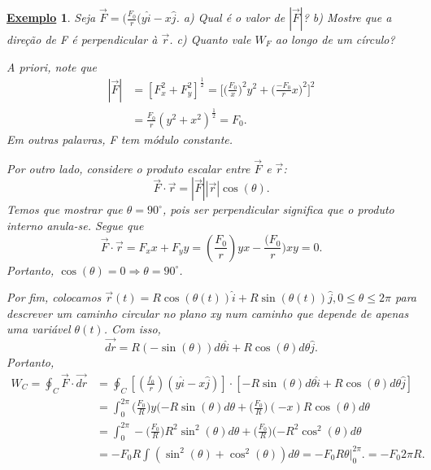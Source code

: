 \documentclass{article}
\newtheorem{example}{\underline{Exemplo}}
\begin{document}
   \begin{example}
      Seja \(\vec{F} = (\frac{F_{0}}{r}(y\hat{i}-x\hat{j}\). a) Qual é o valor de \(|\vec{F}|\)? b) Mostre que a dire\c cão de F é perpendicular à \(\vec{r}\).
      c) Quanto vale \(W_{F}\) ao longo de um círculo?

      A priori, note que 
     \begin{align*}
       |\vec{F}| &= [F_{x}^{2} + F_{y}^{2}]^{\frac{1}{2}} = \biggl[\biggl(\frac{F_{0}}{x}\biggr)^{2}y^{2} + \biggl(\frac{-F_{0}}{r}x\biggr)^{2}\biggr]^{2}\\
                 &= \frac{F_{0}}{r}(y^{2}+x^{2})^{\frac{1}{2}} = F_{0}.
     \end{align*}
     Em outras palavras, F tem módulo constante.

     Por outro lado, considere o produto escalar entre \(\vec{F}\) e \(\vec{r}\): 
       \[
         \vec{F}\cdot \vec{r} = |\vec{F}||\vec{r}|\cos{(\theta )}.
       \]
      Temos que mostrar que \(\theta = 90^{\circ}\), pois ser perpendicular significa que o produto interno anula-se. Segue que 
        \[
          \vec{F}\cdot \vec{r} = F_{x}x + F_{y}y = (\frac{F_{0}}{r})yx - \frac{(F_{0}}{r})xy = 0.
        \]
      Portanto, \(\cos{(\theta )} = 0 \Rightarrow \theta =90^{\circ}\).

      Por fim, colocamos \(\vec{r}(t) = R\cos{(\theta (t))}\hat{i} + R\sin{(\theta (t))}\hat{j}, 0\leq \theta \leq 2\pi \) para descrever um caminho circular 
      no plano xy num caminho que depende de apenas uma variável \(\theta (t)\). Com isso,
      \[
        \vec{dr} = R(-\sin{(\theta )})d\theta \hat{i} + R\cos{(\theta )}d\theta \hat{j}.
      \]
      Portanto, 
     \begin{align*}
       W_{C} = \oint_{C}\vec{F}\cdot \vec{dr} &= \oint_{C}[(\frac{f_{0}}{r})(y\hat{i}-x\hat{j})]\cdot [-R\sin{(\theta )}d\theta \hat{i} + R\cos{(\theta )}d\theta \hat{j}] \\
                                              &= \int_{0}^{2\pi }\biggl(\frac{F_{0}}{R}\biggr)y(-R\sin{(\theta )d\theta } + \biggl(\frac{F_{0}}{R}\biggr)(-x)R\cos{(\theta )}d\theta \\
                                              &= \int_{0}^{2\pi }-\biggl(\frac{F_{0}}{R}\biggr)R^{2}\sin^{2}{(\theta )}d\theta  + \biggl(\frac{F_{0}}{R}\biggr)(-R^{2}\cos^{2}{(\theta )}d\theta \\
                                              &= -F_{0}R \int_{}^{}(\sin^{2}{(\theta )} + \cos^{2}{(\theta )})d\theta  = -F_{0}R\theta \biggl|_{0}^{2\pi }\biggr. = -F_{0}2\pi R.
     \end{align*}
   \end{example}
\newpage
\end{document}
